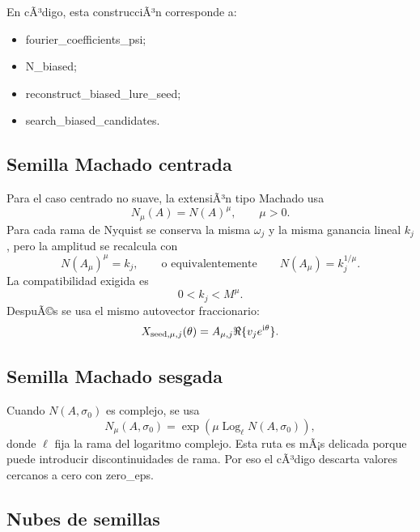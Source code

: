 \documentclass[11pt]{article}
\newcommand{\ii}{\mathrm{i}}
\DeclareRobustCommand{\codepath}[1]{\begingroup\Urlmuskip=0mu plus 2mu\path{#1}\endgroup}
\def\codepath#1{#1}%
\begin{document}
En cÃ³digo, esta construcciÃ³n corresponde a:
\begin{itemize}
\item \codepath{fourier_coefficients_psi};
\item \codepath{N_biased};
\item \codepath{reconstruct_biased_lure_seed};
\item \codepath{search_biased_candidates}.
\end{itemize}

\subsection{Semilla Machado centrada}

Para el caso centrado no suave, la extensiÃ³n tipo Machado usa
\begin{equation}
N_{\mu}(A)=N(A)^\mu,
\qquad \mu>0.
\end{equation}
Para cada rama de Nyquist se conserva la misma \(\omega_j\) y la misma ganancia lineal \(k_j\), pero la amplitud se recalcula con
\begin{equation}
N{(A_\mu)}^\mu=k_j,
\qquad\text{o equivalentemente}\qquad
N(A_\mu)=k_j^{1/\mu}.
\end{equation}
La compatibilidad exigida es
\begin{equation}
0<k_j<M^{\mu}.
\end{equation}
DespuÃ©s se usa el mismo autovector fraccionario:
\begin{equation}
X_{{\rm seed},\mu,j}(\theta)=A_{\mu,j}\Re\{v_j e^{\ii\theta}\}.
\end{equation}

\subsection{Semilla Machado sesgada}

Cuando \(N(A,\sigma_0)\) es complejo, se usa
\begin{equation}
N_{\mu}(A,\sigma_0)=
\exp\left(\mu\operatorname{Log}_{\ell}N(A,\sigma_0)\right),
\end{equation}
donde \(\ell\) fija la rama del logaritmo complejo. Esta ruta es mÃ¡s delicada porque puede introducir discontinuidades de rama. Por eso el cÃ³digo descarta valores cercanos a cero con \codepath{zero_eps}.

\subsection{Nubes de semillas}
\end{document}
